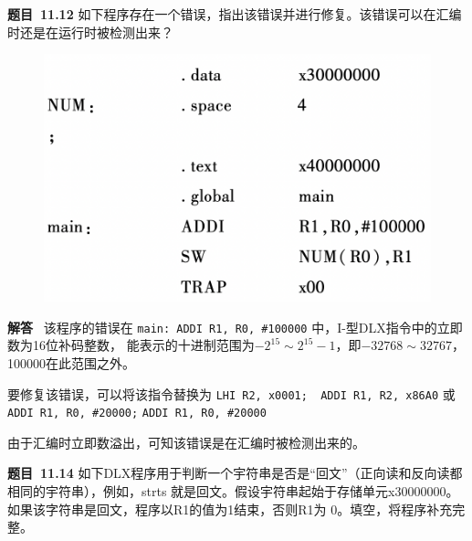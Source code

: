 \documentclass[10pt,a4paper,UTF8]{ctexart}
\newcommand{\problemname}{待定义}
\newenvironment{problem}{\begin{shaded}\par\noindent\textbf{题目\  \problemname}}{\end{shaded}\par}
\newenvironment{solution}{\par\noindent\textbf{解答}\ }{\par}
\begin{document}
\renewcommand{\problemname}{11.12}
\begin{problem}
	如下程序存在一个错误，指出该错误并进行修复。该错误可以在汇编时还是在运行时被检测出来？
\end{problem}

\begin{figure}[H]
	\centering
	\includegraphics[scale=0.4]{img/11.12}
\end{figure}

\begin{solution}
	该程序的错误在 \verb|main: ADDI R1, R0, #100000| 中，I-型DLX指令中的立即数为16位补码整数，
	能表示的十进制范围为$-2^{15}\sim 2^{15}-1$，即$-32768\sim 32767$，100000在此范围之外。

	要修复该错误，可以将该指令替换为 \verb|LHI R2, x0001;  ADDI R1, R2, x86A0|	或
	\verb|ADDI R1, R0, #20000;|   \verb|ADDI R1, R0, #20000|


	由于汇编时立即数溢出，可知该错误是在汇编时被检测出来的。
\end{solution}


\renewcommand{\problemname}{11.14}
\begin{problem}
	如下DLX程序用于判断一个宇符串是否是“回文”（正向读和反向读都相同的宇符串），例如，strts
	就是回文。假设宇符串起始于存储单元x30000000。如果该字符串是回文，程序以R1的值为1结束，否则R1为
	0。填空，将程序补充完整。
\end{problem}
\end{document}
